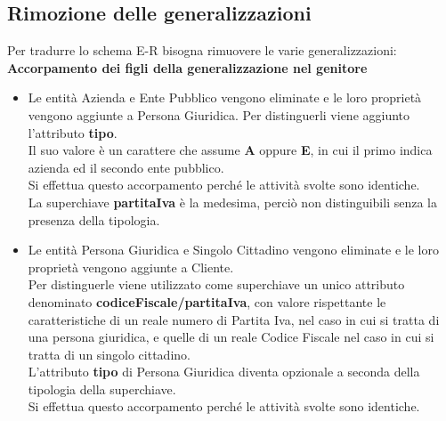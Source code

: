 \documentclass[legalpaper]{article}
\begin{document}
\subsection{Rimozione delle generalizzazioni}
Per tradurre lo schema E-R bisogna rimuovere le varie generalizzazioni:\\
\newline
\textbf{Accorpamento dei figli della generalizzazione nel genitore}
\begin{itemize}
	\item Le entità Azienda e Ente Pubblico vengono eliminate e le loro proprietà vengono aggiunte a Persona Giuridica. Per distinguerli viene aggiunto l'attributo \textbf{tipo}. \\Il suo valore è un carattere che assume \textbf{A} oppure \textbf{E}, in cui il primo indica azienda ed il secondo ente pubblico.\\
	Si effettua questo accorpamento perché le attività svolte sono identiche. \\La superchiave \textbf{partitaIva} è la medesima, perciò non distinguibili senza la presenza della tipologia.
	\item Le entità Persona Giuridica e Singolo Cittadino vengono eliminate e le loro proprietà vengono aggiunte a Cliente. \\Per distinguerle viene utilizzato come superchiave un unico attributo denominato \textbf{codiceFiscale/partitaIva}, con valore rispettante le caratteristiche di un reale numero di Partita Iva, nel caso in cui si tratta di una persona giuridica, e quelle di un reale Codice Fiscale nel caso in cui si tratta di un singolo cittadino.\\ L'attributo \textbf{tipo} di Persona Giuridica diventa opzionale a seconda della tipologia della superchiave.\\
	Si effettua questo accorpamento perché le attività svolte sono identiche.
\end{itemize}

\end{document}
